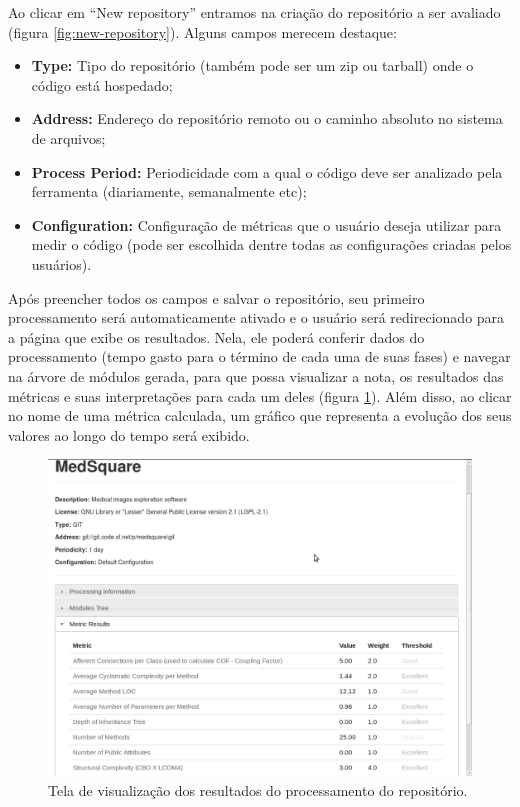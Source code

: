 \documentclass{llncs}
\begin{document}
  Ao clicar em ``New repository'' entramos na criação do repositório a ser avaliado (figura \ref{fig:new-repository}). Alguns campos merecem destaque:
  \begin{itemize}
    \item\textbf{Type:} Tipo do repositório (também pode ser um zip ou tarball) onde o código está hospedado;
    \item\textbf{Address:} Endereço do repositório remoto ou o caminho absoluto no sistema de arquivos;
    \item\textbf{Process Period:} Periodicidade com a qual o código deve ser analizado pela ferramenta (diariamente, semanalmente etc);
    \item\textbf{Configuration:} Configuração de métricas que o usuário deseja utilizar para medir o código (pode ser escolhida dentre todas as configurações criadas pelos usuários).
  \end{itemize}
  Após preencher todos os campos e salvar o repositório, seu primeiro processamento será automaticamente ativado e o usuário será redirecionado para a página que exibe os resultados. Nela, ele poderá conferir dados do processamento (tempo gasto para o término de cada uma de suas fases) e navegar na árvore de módulos gerada, para que possa visualizar a nota, os resultados das métricas e suas interpretações para cada um deles (figura \ref{fig:results}). Além disso, ao clicar no nome de uma métrica calculada, um gráfico que representa a evolução dos seus valores ao longo do tempo será exibido.

  \begin{figure}[H]
    \centering
    \includegraphics[width=\textwidth]{images/new-repository-results.png}
    \caption{Tela de visualização dos resultados do processamento do repositório.}
    \label{fig:results}
  \end{figure}
\end{document}
